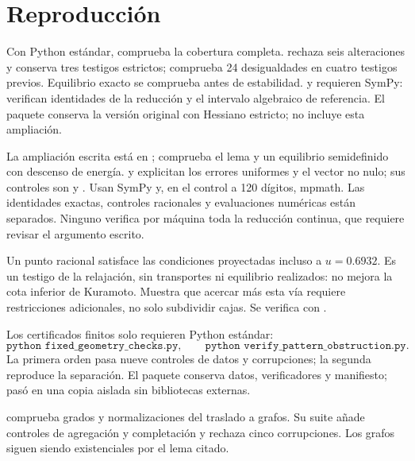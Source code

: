 \documentclass[10pt,a4paper]{article}
\begin{document}
\section{Reproducción}
Con Python estándar,  comprueba la cobertura completa.  rechaza seis alteraciones y conserva tres testigos estrictos;  comprueba 24 desigualdades en cuatro testigos previos. Equilibrio exacto se comprueba antes de estabilidad.  y  requieren SymPy: verifican identidades de la reducción y el intervalo algebraico de referencia. El paquete  conserva la versión original con Hessiano estricto; no incluye esta ampliación.

La ampliación escrita está en ;  comprueba el lema y un equilibrio semidefinido con descenso de energía.  y  explicitan los errores uniformes y el vector no nulo; sus controles son  y . Usan SymPy y, en el control a 120 dígitos, mpmath. Las identidades exactas, controles racionales y evaluaciones numéricas están separados. Ninguno verifica por máquina toda la reducción continua, que requiere revisar el argumento escrito.

Un punto racional satisface las condiciones proyectadas incluso a $u=0.6932$. Es un testigo de la relajación, sin transportes ni equilibrio realizados: no mejora la cota inferior de Kuramoto. Muestra que acercar más esta vía requiere restricciones adicionales, no solo subdividir cajas. Se verifica con .

Los certificados finitos solo requieren Python estándar:
\[
 \texttt{python fixed\_geometry\_checks.py},\qquad
 \texttt{python verify\_pattern\_obstruction.py}.
\]
La primera orden pasa nueve controles de datos y corrupciones; la segunda reproduce la separación. El paquete  conserva datos, verificadores y manifiesto; pasó en una copia aislada sin bibliotecas externas.

 comprueba grados y normalizaciones del traslado a grafos. Su suite añade controles de agregación y completación y rechaza cinco corrupciones. Los grafos siguen siendo existenciales por el lema citado.
\end{document}
